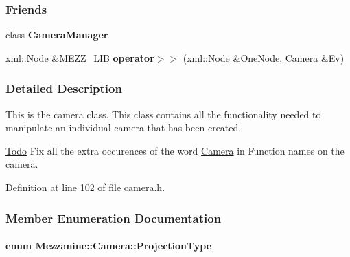 \subsubsection*{Friends}
\begin{DoxyCompactItemize}
\item 
\hypertarget{classMezzanine_1_1Camera_afae5bf9a900e8c5bc70c9332785e8465}{
class {\bfseries CameraManager}}
\label{classMezzanine_1_1Camera_afae5bf9a900e8c5bc70c9332785e8465}

\item 
\hypertarget{classMezzanine_1_1Camera_a4ff0401fc20f1017ee96470c629dd242}{
\hyperlink{classMezzanine_1_1xml_1_1Node}{xml::Node} \&MEZZ\_\-LIB {\bfseries operator$>$$>$} (\hyperlink{classMezzanine_1_1xml_1_1Node}{xml::Node} \&OneNode, \hyperlink{classMezzanine_1_1Camera}{Camera} \&Ev)}
\label{classMezzanine_1_1Camera_a4ff0401fc20f1017ee96470c629dd242}

\end{DoxyCompactItemize}


\subsubsection{Detailed Description}
This is the camera class. This class contains all the functionality needed to manipulate an individual camera that has been created. \begin{Desc}
\item[\hyperlink{todo__todo000004}{Todo}]Fix all the extra occurences of the word \hyperlink{classMezzanine_1_1Camera}{Camera} in Function names on the camera. \end{Desc}


Definition at line 102 of file camera.h.



\subsubsection{Member Enumeration Documentation}
\hypertarget{classMezzanine_1_1Camera_a643bf90630796bca5353967664d5f6e3}{
\paragraph[{ProjectionType}]{\setlength{\rightskip}{0pt plus 5cm}enum {\bf Mezzanine::Camera::ProjectionType}}\hfill}
\label{classMezzanine_1_1Camera_a643bf90630796bca5353967664d5f6e3}


